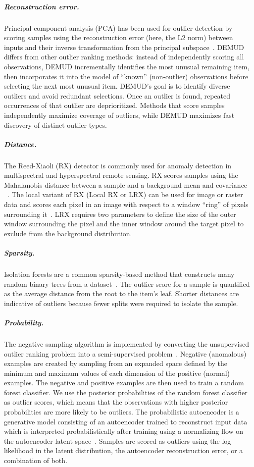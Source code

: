\documentclass[letterpaper]{article} %
\begin{document}
\subparagraph{Reconstruction error.}
Principal component analysis (PCA) has been used for outlier detection by
scoring samples using the reconstruction error (here, the L2 norm)
between inputs and their inverse
 transformation from the principal subspace~\citep{kerner2020comparison}.
 DEMUD~\citep{wagstaff:demud13} differs from other
outlier ranking methods: instead of independently scoring all
observations, DEMUD incrementally identifies the most unusual
remaining item, then incorporates it into the model of ``known''
(non-outlier) observations before selecting the next most unusual
item.  DEMUD's goal is to identify diverse outliers and avoid
redundant selections.  Once an outlier is found, repeated
occurrences of that outlier are deprioritized.  Methods that score
samples independently maximize coverage of outliers, while DEMUD
maximizes fast discovery of distinct outlier types.

\subparagraph{Distance.}
 The 
Reed-Xiaoli (RX) detector is commonly used for anomaly detection in
multispectral and hyperspectral remote sensing. RX scores samples using
 the Mahalanobis
 distance between a sample and a background mean and covariance
 ~\citep{reed1990adaptive}. The local variant of RX (Local
 RX or LRX) can be used for image or raster data and scores each pixel in
  an image with respect to a window ``ring'' of pixels surrounding 
  it~\citep{molero2013analysis}. 
  LRX requires two parameters to define the size of the outer window 
  surrounding the pixel and the inner window
   around the target pixel to exclude from the background distribution. 

\subparagraph{Sparsity.}
Isolation forests are a common sparsity-based method
that constructs many random binary trees from a 
dataset~\cite{liu2008isolation}. The outlier score for
a sample is quantified as the average distance from the root to the item’s 
leaf. Shorter distances are indicative of outliers because fewer splits were 
required to isolate the sample.

\subparagraph{Probability.}
The negative sampling algorithm is implemented by converting the unsupervised 
outlier ranking problem into a semi-supervised 
problem~\citep{sipple:neg-sampling20}. Negative (anomalous) 
examples are created by sampling from an expanded space defined by the minimum 
and maximum values of each dimension of the positive (normal) examples. The 
negative and positive examples are then used to train a random forest 
classifier. We use the posterior probabilities of the random forest classifier 
as outlier scores, which means that the observations with higher posterior 
probabilities are more likely to be outliers.
The probabilistic autoencoder is a generative model consisting of an
autoencoder trained to reconstruct input data which is interpreted
probabilistically after training using a normalizing flow on the autoencoder
latent space~\cite{bohm2020probabilistic}.
Samples are scored as outliers using the log likelihood in the latent
distribution, the autoencoder reconstruction error, or a combination of
both.
\end{document}
